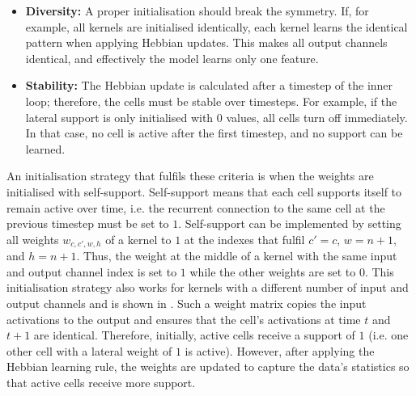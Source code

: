 \begin{itemize}
    \item \textbf{Diversity:} A proper initialisation should break the symmetry. If, for example, all kernels are initialised identically, each kernel learns the identical pattern when applying Hebbian updates. This makes all output channels identical, and effectively the model learns only one feature.
    \item \textbf{Stability:} The Hebbian update is calculated after a timestep of the inner loop; therefore, the cells must be stable over timesteps. For example, if the lateral support is only initialised with $0$ values, all cells turn off immediately. In that case, no cell is active after the first timestep, and no support can be learned.
\end{itemize}

An initialisation strategy that fulfils these criteria is when the weights are initialised with self-support.
Self-support means that each cell supports itself to remain active over time, i.e. the recurrent connection to the same cell at the previous timestep must be set to $1$.
Self-support can be implemented by setting all weights $w_{c, c', w, h}$ of a kernel to $1$ at the indexes that fulfil 
$c' = c$, $w = n+1$, and $h = n+1$. Thus, the weight at the middle of a kernel with the same input and output channel index is set to $1$ while the other weights are set to $0$. This initialisation strategy also works for kernels with a different number of input and output channels and is shown in .
Such a weight matrix copies the input activations to the output and ensures that the cell's activations at time $t$ and $t+1$ are identical. Therefore, initially, active cells receive a support of $1$ (i.e. one other cell with a lateral weight of $1$ is active).
However, after applying the Hebbian learning rule, the weights are updated to capture the data's statistics so that active cells receive more support.


